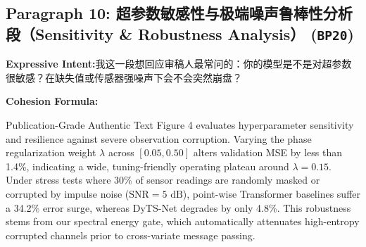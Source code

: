 \subsection*{Paragraph 10: 超参数敏感性与极端噪声鲁棒性分析段（Sensitivity \& Robustness Analysis） (\texttt{BP20})}
\noindent\textbf{Expressive Intent:}\enspace 我这一段想回应审稿人最常问的：你的模型是不是对超参数很敏感？在缺失值或传感器强噪声下会不会突然崩盘？\par
\noindent\textbf{Cohesion Formula:}\par\vspace{4pt}
\begin{ExampleBox}{Publication-Grade Authentic Text}
Figure 4 evaluates hyperparameter sensitivity and resilience against severe observation corruption. Varying the phase regularization weight $\lambda$ across $[0.05, 0.50]$ alters validation MSE by less than 1.4\%, indicating a wide, tuning-friendly operating plateau around $\lambda=0.15$. Under stress tests where 30\% of sensor readings are randomly masked or corrupted by impulse noise ($\text{SNR} = 5\text{ dB}$), point-wise Transformer baselines suffer a 34.2\% error surge, whereas DyTS-Net degrades by only 4.8\%. This robustness stems from our spectral energy gate, which automatically attenuates high-entropy corrupted channels prior to cross-variate message passing.
\end{ExampleBox}
